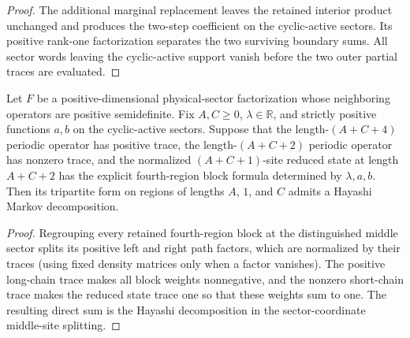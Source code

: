 \begin{proof}\leanok
    The additional marginal replacement leaves the retained interior product
    unchanged and produces the two-step coefficient on the cyclic-active
    sectors. Its positive rank-one factorization separates the two surviving
    boundary sums. All sector words leaving the cyclic-active support vanish
    before the two outer partial traces are evaluated.
\end{proof}

\begin{lemma}
    \label{thm:mpdo_cyclic_active_markov_of_fourth_region}
    \leanok
    Let $F$ be a positive-dimensional physical-sector factorization whose
    neighboring operators are positive semidefinite. Fix $A,C\geq0$,
    $\lambda\in\mathbb R$, and strictly positive functions $a,b$ on the
    cyclic-active sectors. Suppose that the length-$(A+C+4)$ periodic
    operator has positive trace, the length-$(A+C+2)$ periodic operator has
    nonzero trace, and the normalized $(A+C+1)$-site reduced state at length
    $A+C+2$ has the explicit fourth-region block formula determined by
    $\lambda,a,b$. Then its tripartite form on regions of lengths
    $A$, $1$, and $C$ admits a Hayashi Markov decomposition.
\end{lemma}

\begin{proof}\leanok
    Regrouping every retained fourth-region block at the distinguished middle
    sector splits its positive left and right path factors, which are
    normalized by their traces (using fixed density matrices only when a
    factor vanishes). The positive long-chain trace makes all block weights
    nonnegative, and the nonzero short-chain trace makes the reduced state
    trace one so that these weights sum to one. The resulting direct sum is
    the Hayashi decomposition in the sector-coordinate middle-site splitting.
\end{proof}


